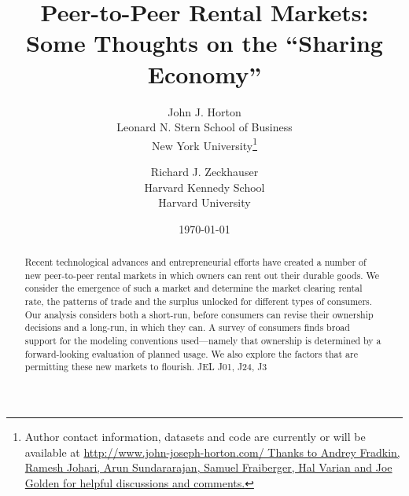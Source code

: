 \documentclass[11pt]{article}
\newcommand{\important}[1]{\textcolor{red}{\textbf{#1}}}
\newcommand{\important}[1]{#1}
\begin{document}
 

\title{Peer-to-Peer Rental Markets:\\
Some Thoughts on the ``Sharing Economy''}

\date{\today}

\author{John J. Horton \\ Leonard N. Stern School of Business \\ New
  York University\footnote{Author contact information, datasets and
    code are currently or will be available at
    \href{http://www.john-joseph-horton.com/}{http://www.john-joseph-horton.com/
    Thanks to Andrey Fradkin, Ramesh Johari, Arun Sundararajan, Samuel Fraiberger, Hal Varian and Joe Golden for helpful discussions and comments.}}
  \and 
  Richard J. Zeckhauser \\ Harvard Kennedy School \\ Harvard University
}
\maketitle


\begin{abstract} 
Recent technological advances and entrepreneurial efforts have created a number of new peer-to-peer rental markets in which owners can rent out their durable goods. 
We consider the emergence of such a market and determine the market clearing rental rate, the patterns of trade and the surplus unlocked for different types of consumers. 
Our analysis considers both a short-run, before consumers can revise their ownership decisions and a long-run, in which they can. 
A survey of consumers finds broad support for the modeling conventions
used---namely that ownership is determined by a forward-looking evaluation of planned usage.
We also explore the factors that are permitting these new markets to flourish. 
\newline \newline 
\noindent JEL J01, J24, J3 
\end{abstract} 

\onehalfspacing
\end{document}
